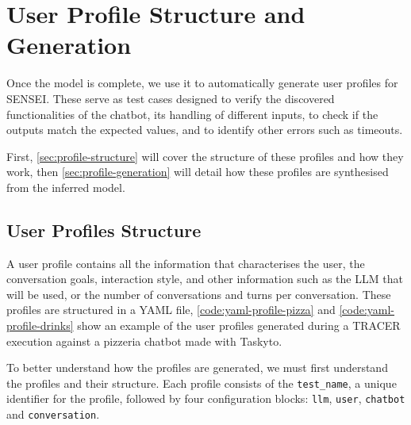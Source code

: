 
\chapter{User Profile Structure and Generation}\label{chapter:user-profiles}

Once the model is complete,
we use it to automatically generate user profiles for SENSEI.
These serve as test cases designed to verify
the discovered functionalities of the chatbot,
its handling of different inputs,
to check if the outputs match the expected values,
and to identify other errors such as timeouts.

First, \autoref{sec:profile-structure}
will cover the structure of these profiles and how they work,
then \autoref{sec:profile-generation}
will detail how these profiles are synthesised from the inferred model.


\section{User Profiles Structure}\label{sec:profile-structure}

A user profile contains all the information
that characterises the user,
the conversation goals,
interaction style,
and other information such as the \ac{LLM} that will be used,
or the number of conversations and turns per conversation.
These profiles are structured in a YAML file,
\autoref{code:yaml-profile-pizza} and \autoref{code:yaml-profile-drinks}
show an example of the user profiles generated during a \ac{TRACER} execution
against a pizzeria chatbot made with Taskyto.







To better understand how the profiles are generated,
we must first understand the profiles and their structure.
Each profile consists of the \texttt{test\_name},
a unique identifier for the profile,
followed by four configuration blocks:
\texttt{llm}, \texttt{user}, \texttt{chatbot} and \texttt{conversation}.

